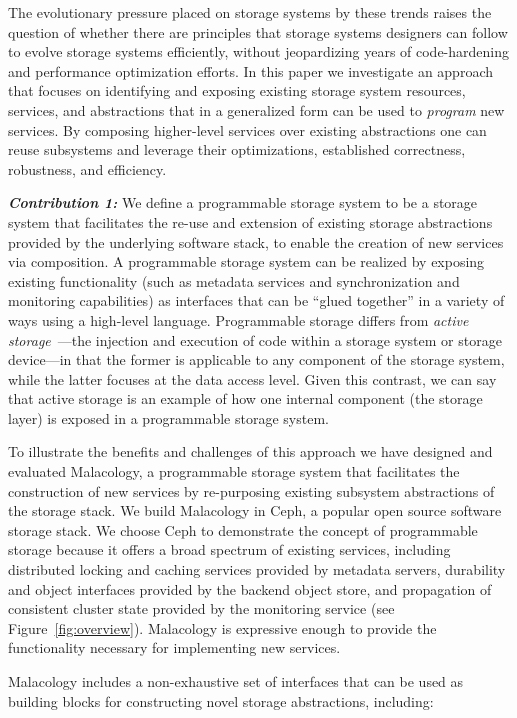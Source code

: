 \documentclass[preprint]{sigplanconf-eurosys}
\begin{document}
The evolutionary pressure placed on storage systems by these trends raises the
question of whether there are principles that storage systems designers can
follow to evolve storage systems efficiently, without jeopardizing years of
code-hardening and performance optimization efforts.  In this paper we
investigate an approach that focuses on identifying and exposing existing
storage system resources, services, and abstractions that in a generalized form
can be used to \emph{program} new services. By composing higher-level services
over existing abstractions one can reuse subsystems and leverage their
optimizations, established correctness, robustness, and efficiency. 

{\it \textbf{Contribution 1:}} We define a programmable storage system to be a
storage system that facilitates the re-use and extension of existing storage
abstractions provided by the underlying software stack, to enable the creation
of new services via composition.  A programmable storage system can be realized
by exposing existing functionality (such as metadata services and
synchronization and monitoring capabilities) as interfaces that can be ``glued
together'' in a variety of ways using a high-level language. Programmable
storage differs from \emph{active storage}~\cite{riedel:vldb98}---the injection
and execution of code within a storage system or storage device---in that the
former is applicable to any component of the storage system, while the latter
focuses at the data access level. Given this contrast, we can say that active
storage is an example of how one internal component (the storage layer) is
exposed in a programmable storage system.

To illustrate the benefits and challenges of this approach we have designed and
evaluated Malacology, a programmable storage system that facilitates the
construction of new services by re-purposing existing subsystem abstractions of
the storage stack.  We build Malacology in Ceph, a popular open source software
storage stack.  We choose Ceph to demonstrate the concept of programmable
storage because it offers a broad spectrum of existing services, including
distributed locking and caching services provided by metadata servers,
durability and object interfaces provided by the backend object store, and
propagation of consistent cluster state provided by the monitoring service (see
Figure~\ref{fig:overview}).  Malacology is expressive enough to provide the
functionality necessary for implementing new services.

Malacology includes a non-exhaustive set of interfaces that can be used as
building blocks for constructing novel storage abstractions, including:
\end{document}
